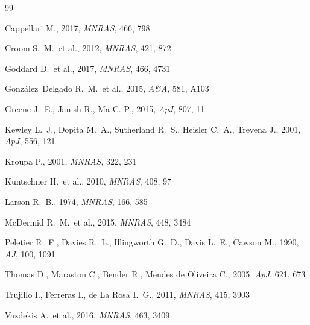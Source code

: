 \begin{thebibliography}{99}

  Cappellari M., 2017, \textit{MNRAS}, 466, 798

  Croom S.~M.\ et al., 2012, \textit{MNRAS}, 421, 872

  Goddard D.\ et al., 2017, \textit{MNRAS}, 466, 4731

  Gonz\'{a}lez~Delgado R.~M.\ et al., 2015, \textit{A\&A}, 581, A103

  Greene J.~E., Janish R., Ma C.-P., 2015, \textit{ApJ}, 807, 11

  Kewley L.~J., Dopita M.~A., Sutherland R.~S., Heisler C.~A.,
  Trevena J., 2001, \textit{ApJ}, 556, 121

  Kroupa P., 2001, \textit{MNRAS}, 322, 231

  Kuntschner H.\ et al., 2010, \textit{MNRAS}, 408, 97

  Larson R.~B., 1974, \textit{MNRAS}, 166, 585

  McDermid R.~M.\ et al., 2015, \textit{MNRAS}, 448, 3484

  Peletier R.~F., Davies R.~L., Illingworth G.~D., Davis L.~E.,
  Cawson M., 1990, \textit{AJ}, 100, 1091

  Thomas D., Maraston C., Bender R., Mendes de Oliveira C., 2005,
  \textit{ApJ}, 621, 673

  Trujillo I., Ferreras I., de La Rosa I.~G., 2011,
  \textit{MNRAS}, 415, 3903

  Vazdekis A.\ et al., 2016, \textit{MNRAS}, 463, 3409

\end{thebibliography}
